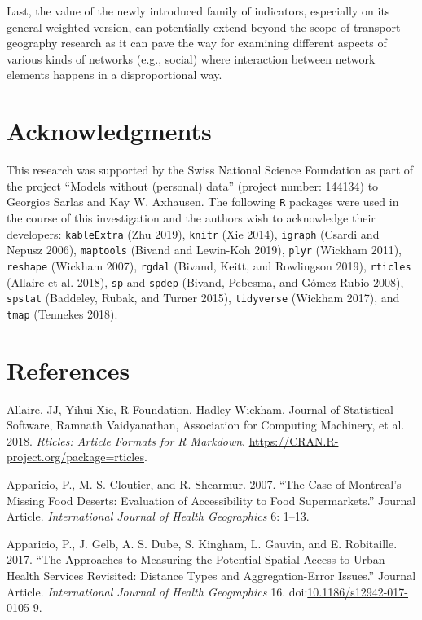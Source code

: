 \documentclass[]{elsarticle} %
\begin{document}
Last, the value of the newly introduced family of indicators, especially
on its general weighted version, can potentially extend beyond the scope
of transport geography research as it can pave the way for examining
different aspects of various kinds of networks (e.g., social) where
interaction between network elements happens in a disproportional way.

\section{Acknowledgments}\label{acknowledgments}

This research was supported by the Swiss National Science Foundation as
part of the project ``Models without (personal) data'' (project number:
144134) to Georgios Sarlas and Kay W. Axhausen. The following \texttt{R}
packages were used in the course of this investigation and the authors
wish to acknowledge their developers: \texttt{kableExtra} (Zhu 2019),
\texttt{knitr} (Xie 2014), \texttt{igraph} (Csardi and Nepusz 2006),
\texttt{maptools} (Bivand and Lewin-Koh 2019), \texttt{plyr} (Wickham
2011), \texttt{reshape} (Wickham 2007), \texttt{rgdal} (Bivand, Keitt,
and Rowlingson 2019), \texttt{rticles} (Allaire et al. 2018),
\texttt{sp} and \texttt{spdep} (Bivand, Pebesma, and Gómez-Rubio 2008),
\texttt{spstat} (Baddeley, Rubak, and Turner 2015), \texttt{tidyverse}
(Wickham 2017), and \texttt{tmap} (Tennekes 2018).

\section*{References}\label{references}

\hypertarget{refs}{}
\hypertarget{ref-Allaire2018rticles}{}
Allaire, JJ, Yihui Xie, R Foundation, Hadley Wickham, Journal of
Statistical Software, Ramnath Vaidyanathan, Association for Computing
Machinery, et al. 2018. \emph{Rticles: Article Formats for R Markdown}.
\url{https://CRAN.R-project.org/package=rticles}.

\hypertarget{ref-Apparicio2007}{}
Apparicio, P., M. S. Cloutier, and R. Shearmur. 2007. ``The Case of
Montreal's Missing Food Deserts: Evaluation of Accessibility to Food
Supermarkets.'' Journal Article. \emph{International Journal of Health
Geographics} 6: 1--13.

\hypertarget{ref-Apparicio2017}{}
Apparicio, P., J. Gelb, A. S. Dube, S. Kingham, L. Gauvin, and E.
Robitaille. 2017. ``The Approaches to Measuring the Potential Spatial
Access to Urban Health Services Revisited: Distance Types and
Aggregation-Error Issues.'' Journal Article. \emph{International Journal
of Health Geographics} 16.
doi:\href{https://doi.org/10.1186/s12942-017-0105-9}{10.1186/s12942-017-0105-9}.
\end{document}
